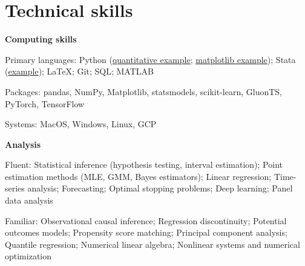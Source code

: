 \documentclass[10pt]{article}
\newcommand{\mysep}{\vspace{4pt}}
\begin{document}
\mysep{}
\section*{Technical skills}

\textbf{Computing skills}
\begin{blist}
\item Primary languages:
Python
(\href{https://github.com/tara-sullivan/hcs/blob/master/hcs/model/afmodel.py}{quantitative example}; 
\href{https://github.com/tara-sullivan/hcs/blob/master/hcs/img/code/plot_line_labels.py}{matplotlib example});
Stata (\href{https://github.com/tara-sullivan/hcs/blob/master/hcs/data/ipeds/c/clean_data/ipeds_c_clean.do}{example}); 
\LaTeX; Git; SQL; MATLAB

\item Packages:
pandas, NumPy, Matplotlib, statsmodels, scikit-learn, GluonTS, PyTorch, TensorFlow
\item Systems: MacOS, Windows, Linux, GCP
\end{blist}

\mysep{}
\textbf{Analysis}
\begin{blist}
\item Fluent:
Statistical inference (hypothesis testing, interval estimation);
Point estimation methods (MLE, GMM, Bayes estimators);
Linear regression;
Time-series analysis;
Forecasting;
Optimal stopping problems;
Deep learning;
Panel data analysis

\item Familiar: 
Observational causal inference;
Regression discontinuity;
Potential outcomes models;
Propensity score matching; 
Principal component analysis;
Quantile regression;
Numerical linear algebra;
Nonlinear systems and numerical optimization 
\end{blist}
\end{document}
